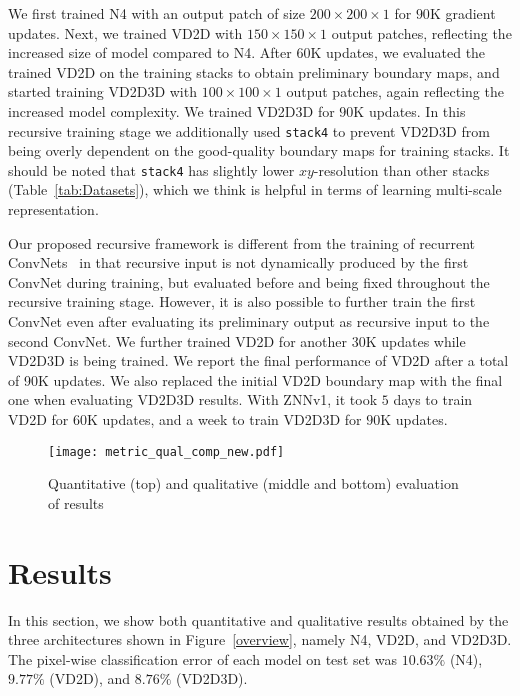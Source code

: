 \documentclass{article} %
\begin{document}
We first trained N4 with an output patch of size $200\times200\times1$ for $90$K gradient updates. Next, we trained VD2D with $150\times150\times1$ output patches, reflecting the increased size of model compared to N4. After $60$K updates, we evaluated the trained VD2D on the training stacks to obtain preliminary boundary maps, and started training VD2D3D with $100\times100\times1$ output patches, again reflecting the increased model complexity. We trained VD2D3D for $90$K updates. In this recursive training stage we additionally used \texttt{stack4} to prevent VD2D3D from being overly dependent on the good-quality boundary maps for training stacks. It should be noted that \texttt{stack4} has slightly lower $xy$-resolution than other stacks (Table~\ref{tab:Datasets}), which we think is helpful in terms of learning multi-scale representation.

Our proposed recursive framework is different from the training of recurrent ConvNets~\cite{Pinheiro2014} in that recursive input is not dynamically produced by the first ConvNet during training, but evaluated before and being fixed throughout the recursive training stage. However, it is also possible to further train the first ConvNet even after evaluating its preliminary output as recursive input to the second ConvNet. We further trained VD2D for another $30$K updates while VD2D3D is being trained. We report the final performance of VD2D after a total of 90K updates. We also replaced the initial VD2D boundary map with the final one when evaluating VD2D3D results. With ZNNv1, it took $5$ days to train VD2D for $60$K updates, and a week to train VD2D3D for $90$K updates.

\begin{figure}[!t]
\begin{center}
\texttt{[image: metric\_qual\_comp\_new.pdf]}
\end{center}
\caption{Quantitative (top) and qualitative (middle and bottom) evaluation of results}
\label{results}
\end{figure}

\section{Results}
In this section, we show both quantitative and qualitative results obtained by the three architectures shown in Figure~\ref{overview}, namely N4, VD2D, and VD2D3D. The pixel-wise classification error of each model on test set was $10.63\%$ (N4), $9.77\%$ (VD2D), and $8.76\%$ (VD2D3D).
\end{document}
